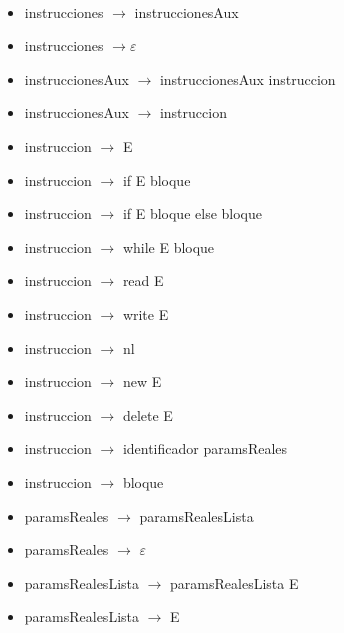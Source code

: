 \documentclass[11pt]{article}
\begin{document}
        \
        \begin{itemize}
            \item instrucciones $\rightarrow$ instruccionesAux
            \item instrucciones $\rightarrow \varepsilon$
            \item instruccionesAux $\rightarrow$ instruccionesAux instruccion 
            \item instruccionesAux $\rightarrow$ instruccion 
            \item instruccion  $\rightarrow$ E
            \item instruccion  $\rightarrow$ if E bloque
            \item instruccion  $\rightarrow$ if E bloque else bloque
            \item instruccion  $\rightarrow$ while E bloque
            \item instruccion  $\rightarrow$ read E
            \item instruccion  $\rightarrow$ write E
            \item instruccion  $\rightarrow$ nl
            \item instruccion  $\rightarrow$ new E
            \item instruccion  $\rightarrow$ delete E
            \item instruccion  $\rightarrow$ identificador paramsReales
            \item instruccion $\rightarrow$ bloque
            \item paramsReales $\rightarrow$ paramsRealesLista
            \item paramsReales $\rightarrow$ $\varepsilon$
            \item paramsRealesLista $\rightarrow$ paramsRealesLista E 
            \item paramsRealesLista $\rightarrow$ E
        \end{itemize}
        \ 
\end{document}
